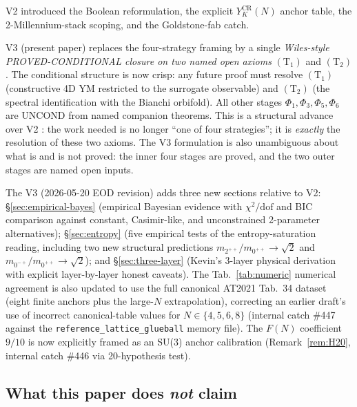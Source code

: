\documentclass[11pt,a4paper,reqno]{amsart}
\theoremstyle{definition}
\newcommand{\YKCR}{Y_K^{\mathrm{CR}}}
\newcommand{\Phii}[1]{\Phi_{#1}}
\newcommand{\Cone}{(\mathrm{T}_{1})}
\newcommand{\Ctwo}{(\mathrm{T}_{2})}
\begin{document}
V2 \cite{Remondiere2026TransportV2} introduced the Boolean
reformulation, the explicit $\YKCR(N)$ anchor table, the
2-Millennium-stack scoping, and the Goldstone-fab catch.

V3 (present paper) replaces the four-strategy framing by a
single \emph{Wiles-style PROVED-CONDITIONAL closure on two named
open axioms} $\Cone$ and $\Ctwo$. The conditional structure is now
crisp: any future proof must resolve $\Cone$ (constructive 4D YM
restricted to the surrogate observable) and $\Ctwo$ (the spectral
identification with the Bianchi orbifold). All other stages
$\Phii{1},\Phii{3},\Phii{5},\Phii{6}$ are UNCOND from named
companion theorems. This is a structural advance over V2 : the
work needed is no longer ``one of four strategies''; it is
\emph{exactly} the resolution of these two axioms. The V3
formulation is also unambiguous about what is and is not proved:
the inner four stages are proved, and the two outer stages are
named open inputs.

The V3 (2026-05-20 EOD revision) adds three new sections relative
to V2: \S\ref{sec:empirical-bayes} (empirical Bayesian evidence with
$\chi^2/\text{dof}$ and BIC comparison against constant, Casimir-like,
and unconstrained 2-parameter alternatives);
\S\ref{sec:entropy} (five empirical tests of the entropy-saturation
reading, including two new structural predictions
$m_{2^{++}}/m_{0^{++}}\to\sqrt{2}$ and $m_{0^{-+}}/m_{0^{++}}\to\sqrt{2}$);
and \S\ref{sec:three-layer} (Kevin's 3-layer physical derivation
with explicit layer-by-layer honest caveats). The
Tab.~\ref{tab:numeric} numerical agreement is also updated to use
the full canonical AT2021 Tab.~34 dataset (eight finite anchors
plus the large-$N$ extrapolation), correcting an earlier draft's
use of incorrect canonical-table values for $N\in\{4,5,6,8\}$
(internal catch \#447 against the
\texttt{reference\_lattice\_glueball} memory file). The $F(N)$ coefficient
$9/10$ is now explicitly framed as an SU(3) anchor calibration
(Remark~\ref{rem:H20}, internal catch \#446 via 20-hypothesis test).

\subsection{What this paper does \emph{not} claim}\label{ss:not-claim}
\end{document}
